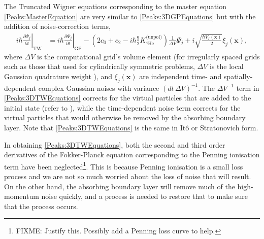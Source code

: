 The Truncated Wigner equations corresponding to the master equation \eqref{Peaks:MasterEquation} are very similar to \eqref{Peaks:3DGPEquations} but with the addition of noise-correction terms,
\begin{align}
    \label{Peaks:3DTWEquations}
    \left. i \hbar \frac{\partial \Psi_j}{\partial t}\right|_\text{TW} &= \left. i \hbar \frac{\partial \Psi_j}{\partial t}\right|_\text{GP} - \left(2 c_0 + c_2 - i \hbar \frac{9}{2}K^\text{(unpol)}_{^4\text{He}}\right)\frac{1}{\Delta V}\Psi_j + i\sqrt{\frac{\hbar V_I(\bm{x})}{2}} \xi_j(\bm{x}),
\end{align}
where $\Delta V$ is the computational grid's volume element (for irregularly spaced grids such as those that used for cylindrically symmetric problems, $\Delta V$ is the local Gaussian quadrature weight \citep{Ronen:2006}), and $\xi_j(\bm{x})$ are independent time- and spatially-dependent complex Gaussian noises with variance $\displaystyle \left(dt\, \Delta V\right)^{-1}$. The $\Delta V^{-1}$ term in \eqref{Peaks:3DTWEquations} corrects for the virtual particles that are added to the initial state (refer to ), while the time-dependent noise term corrects for the virtual particles that would otherwise be removed by the absorbing boundary layer. Note that \eqref{Peaks:3DTWEquations} is the same in Itô or Stratonovich form.

In obtaining \eqref{Peaks:3DTWEquations}, both the second and third order derivatives of the Fokker-Planck equation corresponding to the Penning ionisation term have been neglected\footnote{FIXME: Justify this. Possibly add a Penning loss curve to help.}. 
This is because Penning ionisation is a small loss process and we are not so much worried about the loss of noise that will result. On the other hand, the absorbing boundary layer will remove much of the high-momentum noise quickly, and a process is needed to restore that to make sure that the process occurs.

